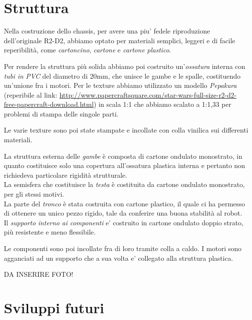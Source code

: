 \documentclass[12pt]{article}
\begin{document}
\section{Struttura}


Nella costruzione dello chassis, per avere una piu' fedele riproduzione dell'originale R2-D2, abbiamo optato per materiali semplici, leggeri e di facile reperibilità, come \emph{cartoncino}, \emph{cartone} e \emph{cartone plastico}.\\
\begin{minipage}{\linewidth}
\medskip
Per rendere la struttura più solida abbiamo poi costruito un'\emph{ossatura} interna con \emph{tubi in PVC} del diametro di 20mm, che unisce le gambe e le spalle, costituendo un'unione fra i motori.
Per le texture abbiamo utilizzato un modello \emph{Pepakura} (reperibile al link: \url{http://www.papercraftsquare.com/star-wars-full-size-r2-d2-free-papercraft-download.html}) in scala 1:1 che abbiamo scalato a 1:1,33 per problemi di stampa delle singole parti.
\medskip
\end{minipage}

Le varie texture sono poi state stampate e incollate con colla vinilica sui differenti materiali.

\bigskip

La struttura esterna delle \emph{gambe} è composta di cartone ondulato monostrato, in quanto costituisce solo una copertura all'ossatura plastica interna e pertanto non richiedeva particolare rigidità strutturale.\\
La semisfera che costituisce la \emph{testa} è costituita da cartone ondulato monostrato, per gli stessi motivi.\\
La parte del \emph{tronco} è stata costruita con cartone plastico, il quale ci ha permesso di ottenere un unico pezzo rigido, tale da conferire una buona stabilità al robot.\\
Il \emph{supporto interno ai componenti} e' costruito in cartone ondulato doppio strato, più resistente e meno flessibile.

Le componenti sono poi incollate fra di loro tramite colla a caldo.
I motori sono agganciati ad un supporto che a sua volta e' collegato alla struttura plastica. 

\bigskip

DA INSERIRE FOTO!

\section{Sviluppi futuri}
\end{document}

